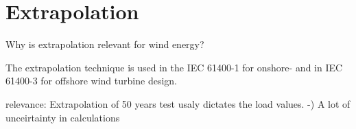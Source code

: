 \chapter{Extrapolation}



Why is extrapolation relevant for wind energy?

The extrapolation technique is used in the IEC 61400-1 for onshore- \cite{Eolica2005} and in IEC 61400-3 \cite{Store2007} for offshore wind turbine design.

relevance:
Extrapolation of 50 years test usaly dictates the load values.
-) A lot of unceirtainty in calculations

